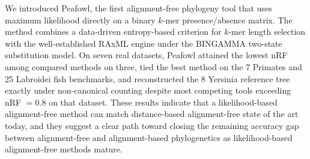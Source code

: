 \documentclass[11pt]{article}
\begin{document}
We introduced Peafowl, the first alignment-free phylogeny tool that uses
maximum likelihood directly on a binary $k$-mer presence/absence matrix.
The method combines a data-driven entropy-based criterion for $k$-mer
length selection with the well-established RAxML engine under the BINGAMMA
two-state substitution model. On seven real datasets, Peafowl attained the
lowest nRF among compared methods on three, tied the best method on the 7
Primates and 25 Labroidei fish benchmarks, and reconstructed the 8 Yersinia
reference tree exactly under non-canonical counting despite most competing
tools exceeding nRF $= 0.8$ on that dataset. These results indicate that a
likelihood-based alignment-free method can match distance-based alignment-free
state of the art today, and they suggest a clear path toward closing the
remaining accuracy gap between alignment-free and alignment-based
phylogenetics as likelihood-based alignment-free methods mature.



\end{document}
